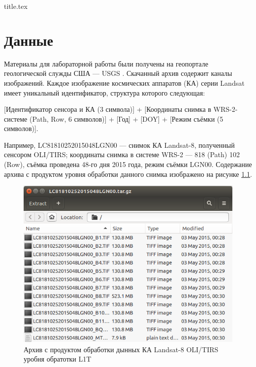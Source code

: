 

\usepackage{csvsimple}



{title.tex}

\clearpage



\clearpage
{}
\pagestyle{fancy}
\setcounter{page}{2}

\clearpage

\chapter{Данные}

Материалы для лабораторной работы были получены на геопортале геологической служды США --- USGS \cite{USGS}. Скачанный архив содержит каналы изображений. Каждое изображение космических аппаратов (КА) серии Landsat имеет уникальный идентификатор, структура которого следующая:

[Идентификатор сенсора и КА (3 символа)] + [Координаты снимка в WRS-2-системе (Path, Row, 6 символов)] + [Год] + [DOY] + [Режим съёмки (5 символов)].

Например, LC81810252015048LGN00 --- снимок КА Landsat-8, полученный сенсором OLI/TIRS; координаты снимка в системе WRS-2 --- 818 (Path) 102 (Row), съёмка проведена 48-го дня 2015 года, режим съёмки LGN00. Содержание архива с продуктом уровня обработки  данного снимка изображено на рисунке \ref{archive}. 

\begin{figure}[h]
  \centering
  \includegraphics[width=.75\textwidth]{archive.png}
  \caption{Архив с продуктом обработки дынных КА Landsat-8 OLI/TIRS уробня обратотки L1T}
\label{archive}
\end{figure}


